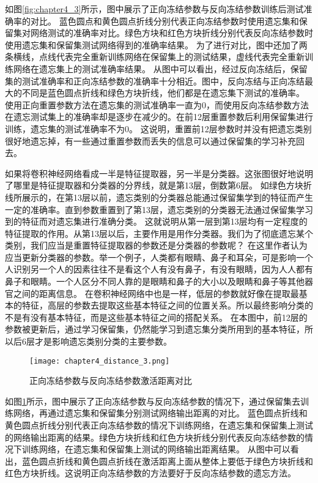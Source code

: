 如图\ref{fig:chapter4_3}所示，图中展示了正向冻结参数与反向冻结参数训练后测试准确率的对比。
蓝色圆点和黄色圆点折线分别代表正向冻结参数时使用遗忘集和保留集对网络测试的准确率对比。绿色方块和红色方块折线分别代表反向冻结参数时使用遗忘集和保留集测试网络得到的准确率结果。
为了进行对比，图中还加了两条横线，点线代表完全重新训练网络在保留集上的测试结果，虚线代表完全重新训练网络在遗忘集上的测试准确率结果。
从图中可以看出，经过反向冻结后，保留集的测试准确率和正向冻结参数的准确率十分相近。图中，反向冻结与正向冻结最大的不同是蓝色圆点折线和绿色方块折线，他们都是在遗忘集下测试的准确率。
使用正向重置参数方法在遗忘集的测试准确率一直为0，而使用反向冻结参数方法在遗忘测试集上的准确率却是逐步在减少的。在前12层重置参数后利用保留集进行训练，遗忘集的测试准确率不为0。
这说明，重置前12层参数时并没有把遗忘类别很好地遗忘掉，有一些通过重置参数而丢失的信息可以通过保留集的学习补充回去。

如果将卷积神经网络看成一半是特征提取器，另一半是分类器。这张图很好地说明了哪里是特征提取器和分类器的分界线，就是第13层，倒数第6层。
如绿色方块折线所展示的，在第13层以前，遗忘类别的分类器总能通过保留集学到的特征而产生一定的准确率。直到参数重置到了第13层，遗忘类别的分类器无法通过保留集学习到的特征而对遗忘集进行准确分类。
这就说明从第一层到第13层均有一定程度的特征提取的作用。从第13层以后，主要作用是用作分类器。我们为了彻底遗忘某个类别，我们应当是重置特征提取器的参数还是分类器的参数呢？
在这里作者认为应当更新分类器的参数。举一个例子，人类都有眼睛、鼻子和耳朵，可是影响一个人识别另一个人的因素往往不是看这个人有没有鼻子，有没有眼睛，因为人人都有鼻子和眼睛。一个人区分不同人靠的是眼睛和鼻子的大小以及眼睛和鼻子等其他器官之间的距离信息。
在卷积神经网络中也是一样，低层的参数就好像在提取最基本的特征，高层的参数去提取这些基本特征之间的位置关系。所以最终影响分类的不是有没有基本特征，而是这些基本特征之间的搭配关系。
在本图中，前12层的参数被更新后，通过学习保留集，仍然能学习到遗忘集分类所用到的基本特征，所以后6层才是影响遗忘类别分类的主要参数。
\begin{figure}
    \centering
    \texttt{[image: chapter4\_distance\_3.png]}
    \caption{正向冻结参数与反向冻结参数激活距离对比}
    \label{fig:chapter4_distance_3}
\end{figure}

如图\ref{fig:chapter4_distance_3}所示，图中展示了正向冻结参数与反向冻结参数的情况下，通过保留集去训练网络，再通过遗忘集和保留集分别测试网络输出距离的对比。
蓝色圆点折线和黄色圆点折线分别代表正向冻结参数的情况下训练网络，在遗忘集和保留集上测试的网络输出距离的结果。绿色方块折线和红色方块折线分别代表反向冻结参数的情况下训练网络，在遗忘集和保留集上测试的网络输出距离结果。
从图中可以看出，蓝色圆点折线和黄色圆点折线在激活距离上面从整体上要低于绿色方块折线和红色方块折线。这说明正向冻结参数的方法要好于反向冻结参数的遗忘方法。
